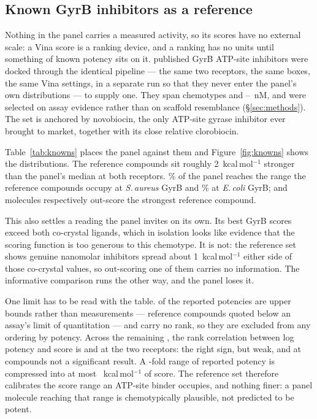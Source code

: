 \documentclass[11pt,a4paper]{article}
\begin{document}
\subsection{Known GyrB inhibitors as a reference}
\label{sec:knowns}

Nothing in the panel carries a measured activity, so its scores have no
external scale: a Vina score is a ranking device, and a ranking has no units
until something of known potency sits on it. \nKnowns{} published GyrB
ATP-site inhibitors were docked through the identical pipeline --- the same
two receptors, the same boxes, the same Vina settings, in a separate run so
that they never enter the panel's own distributions --- to supply one. They
span \nKnownsChemotypes{} chemotypes and
\knownsPotencyLo{}--\knownsPotencyHi{}~nM, and were selected on assay
evidence rather than on scaffold resemblance (\S\ref{sec:methods}). The set
is anchored by novobiocin, the only ATP-site gyrase inhibitor ever brought to
market, together with its close relative clorobiocin.

Table~\ref{tab:knowns} places the panel against them and
Figure~\ref{fig:knowns} shows the distributions. The reference compounds sit
roughly 2~kcal\,mol$^{-1}$ stronger than the panel's median at both
receptors.
\knownsReachGyrbSaureus\% of the panel reaches the range the reference
compounds occupy at \textit{S.\,aureus} GyrB and
\knownsReachGyrbEcoli\% at \textit{E.\,coli} GyrB;
\knownsBeatBestGyrbSaureus{} and \knownsBeatBestGyrbEcoli{} molecules
respectively out-score the strongest reference compound.

This also settles a reading the panel invites on its own. Its best GyrB
scores exceed both co-crystal ligands, which in isolation looks like evidence
that the scoring function is too generous to this chemotype. It is not: the
reference set shows genuine nanomolar inhibitors spread about
1~kcal\,mol$^{-1}$ either side of those co-crystal values, so out-scoring one
of them carries no information. The informative comparison runs the other
way, and the panel loses it.

One limit has to be read with the table. \nKnownsCensored{} of the
\nKnowns{} reported potencies are upper bounds rather than measurements ---
reference compounds quoted below an assay's limit of quantitation --- and
carry no rank, so they are excluded from any ordering by potency. Across the
remaining \nKnownsExact{}, the rank correlation between log potency and score
is \knownsSpearmanLo{} and \knownsSpearmanHi{} at the two receptors: the
right sign, but weak, and at \nKnownsExact{} compounds not a significant
result. A \knownsPotencyFold-fold range of reported potency is compressed
into at most \knownsScoreSpan~kcal\,mol$^{-1}$ of score. The reference set
therefore calibrates the score range an ATP-site binder occupies, and nothing
finer: a panel molecule reaching that range is chemotypically plausible, not
predicted to be potent.
\end{document}
